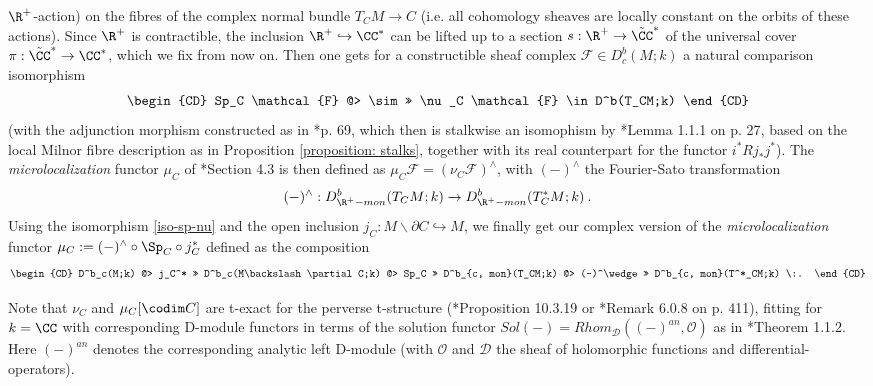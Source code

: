\documentclass[11pt,letterpaper]{amsart}
\numberwithin{equation}{section}
\begin{document}
$\R^+$-action) on the fibres of the complex normal bundle $T_CM\to C$ (i.e. all cohomology sheaves are locally constant on the orbits of these actions). Since $\R^+$ is contractible, the inclusion $\R^+\hookrightarrow \CC^*$ can be lifted up to a section
$s: \R^+\to \tilde{\CC}^*$ of the universal cover $\pi: \tilde{\CC}^*\to \CC^*$, which we fix from now on. Then one gets for a constructible sheaf complex 
$\mathcal{F}\in D^b_c(M;k)$ a natural comparison isomorphism
\begin{equation} \label{iso-sp-nu}
\begin{CD}
  Sp_C  \mathcal{F} @> \sim >> \nu_C \mathcal{F}
  \in D^b(T_CM;k) 
\end{CD}\end{equation}
(with the adjunction morphism constructed as in \cite{Sch03}*{p. 69}, which then is stalkwise an isomophism by \cite{Sch03}*{Lemma 1.1.1 on p. 27}, based on the local Milnor fibre description as in Proposition \ref{proposition: stalks},
together with its real counterpart for the functor $i^*Rj_*j^*$).
The {\it microlocalization} functor $\mu_C$ of \cite{KaS94}*{Section 4.3} is then defined as $\mu_C\mathcal{F} = \left(\nu_C\mathcal{F}\right)^\wedge$, with $(-)^\wedge$ the Fourier-Sato transformation
$$(-)^\wedge: D^b_{\R^+-mon}(T_CM;k)\to D^b_{\R^+-mon}(T^*_CM;k)\:.$$
Using the isomorphism \eqref{iso-sp-nu}
and the open inclusion $j_C: M\backslash \partial C \hookrightarrow M$,
we finally get our complex version of the  {\it microlocalization} functor $\mu_C:=(-)^\wedge \circ \Sp_C \circ  j_C^*$ defined as the composition
\begin{equation}\label{micloc}
\begin{CD}
  D^b_c(M;k) @> j_C^* >> D^b_c(M\backslash \partial C;k) @> Sp_C >> D^b_{c, mon}(T_CM;k)
 @> (-)^\wedge >>   D^b_{c, mon}(T^*_CM;k) \:. 
\end{CD}\end{equation}

Note that $\nu_C$ and $\mu_C[\codim C]$ are t-exact for the perverse t-structure (\cite{KaS94}*{Proposition 10.3.19} or
\cite{Sch03}*{Remark 6.0.8 on p. 411}), fitting for $k=\CC$ with corresponding D-module functors in terms of the solution functor $Sol(-)=Rhom_\mathcal{D}((-)^{an}, \mathcal{O})$ as in 
\cite{MF96}*{Theorem 1.1.2}.
Here $(-)^{an}$ denotes the corresponding analytic left D-module
(with $\mathcal{O}$ and $\mathcal{D}$ the sheaf of holomorphic functions and differential-operators).
\\
\end{document}
